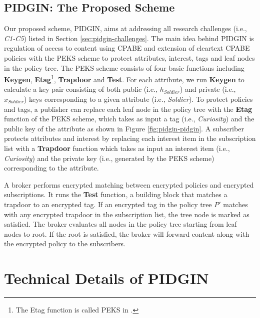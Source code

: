 \documentclass[epsfig,a4paper,11pt,titlepage]{book}
\numberwithin{algorithm}{chapter}
\begin{document}
\subsection[PIDGIN: The Proposed Scheme]{\gls{PIDGIN}: The Proposed Scheme}
Our proposed scheme, \gls{PIDGIN}, aims at addressing all research challenges (i.e., \textit{C1-C5}) listed in Section \ref{sec:pidgin-challenges}. The main idea behind \gls{PIDGIN} is regulation of access to content using \gls{CPABE} and extension of cleartext \gls{CPABE} policies with the \gls{PEKS} scheme \cite{Boneh:2004} to protect attributes, interest, tags and leaf nodes in the policy tree. The \gls{PEKS} scheme consists of four basic functions including \textbf{Keygen}, \textbf{Etag}\footnote{The Etag function is called \gls{PEKS} in \cite{Boneh:2004}.}, \textbf{Trapdoor} and \textbf{Test}. For each attribute, we run \textbf{Keygen} to calculate a key pair consisting of both public (i.e., $h_{Soldier}$) and private (i.e., $x_{Soldier}$) keys corresponding to a given attribute (i.e., \emph{Soldier}). To protect policies and tags, a publisher can replace each leaf node in the policy tree with the \textbf{Etag} function of the \gls{PEKS} scheme, which takes as input a tag (i.e., \emph{Curiosity}) and the public key of the attribute as shown in Figure \ref{fig:pidgin-pidgin}. A subscriber protects attributes and interest by replacing each interest item in the subscription list with a \textbf{Trapdoor} function which takes as input an interest item (i.e., \emph{Curiosity}) and the private key (i.e., generated by the \gls{PEKS} scheme) corresponding to the attribute. 

A broker performs encrypted matching between encrypted policies and encrypted subscriptions. It runs the \textbf{Test} function, a building block that matches a trapdoor to an encrypted tag. If an encrypted tag in the policy tree $P'$ matches with any encrypted trapdoor in the subscription list, the tree node is marked as satisfied. The broker evaluates all nodes in the policy tree starting from leaf nodes to root. If the root is satisfied, the broker will forward content along with the encrypted policy to the subscribers.

\section[Technical Details of PIDGIN]{Technical Details of \acrshort{PIDGIN}}
\label{sec:pidgin-details}
\end{document}
